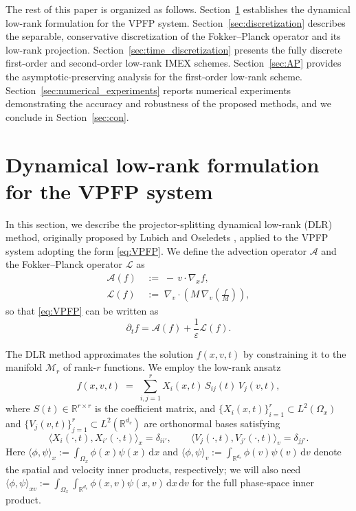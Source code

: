 \documentclass[]{article}
\numberwithin{equation}{section}
\newcommand{\dv}{\mathrm{d}v}
\newcommand{\dx}{\mathrm{d}x}
\begin{document}
The rest of this paper is organized as follows. 
Section~\ref{sec:dlr_algorithm} establishes the dynamical low-rank formulation for the VPFP system.
Section~\ref{sec:discretization} describes the separable, conservative discretization of the Fokker--Planck operator and its low-rank projection.
Section~\ref{sec:time_discretization} presents the fully discrete first-order and second-order low-rank IMEX schemes.
Section~\ref{sec:AP} provides the asymptotic-preserving analysis for the first-order low-rank scheme.
Section~\ref{sec:numerical_experiments} reports numerical experiments demonstrating the accuracy and robustness of the proposed methods, and we conclude in Section~\ref{sec:con}.

\section{Dynamical low-rank formulation for the VPFP system}
\label{sec:dlr_algorithm}

In this section, we describe the projector-splitting dynamical low-rank (DLR) method, originally proposed by Lubich and Oseledets \cite{lubich2014projector}, applied to the VPFP system  adopting the form \eqref{eq:VPFP}. We define the advection operator $\mathcal{A}$ and the Fokker--Planck operator $\mathcal{L}$ as
\begin{align}
  \mathcal{A}(f) &\,:=\; -\,v\cdot\nabla_x f, \label{eq:op_A_def} \\
  \mathcal{L}(f) &\,:=\; \nabla_v \cdot \left(M\,\nabla_v \left(\tfrac{f}{M}\right)\right),\label{eq:op_L_def}
\end{align}
so that  \eqref{eq:VPFP} can be written as 
\begin{equation}
\label{eq:VPFP-1}
    \partial_t f = \mathcal{A}(f) + \frac{1}{\varepsilon}\mathcal{L}(f).
\end{equation}

The DLR method approximates the solution \(f(x,v,t)\) by constraining it to the manifold \(\mathcal{M}_r\) of rank-\(r\) functions. We employ the low-rank ansatz
\begin{equation}\label{eq:rank_dlra_sum}
  f(x,v,t) \;=\;
\sum_{i,j=1}^r X_i(x,t)\,S_{ij}(t)\,V_j(v,t),
\end{equation}
where \(S(t) \in \mathbb{R}^{r \times r}\) is the coefficient matrix, and \(\{X_i(x,t)\}_{i=1}^r \subset L^2(\Omega_x)\) and \(\{V_j(v,t)\}_{j=1}^r \subset L^2(\mathbb{R}^{d_v})\) are orthonormal bases satisfying
\[
  \langle X_i(\cdot,t),X_{i'}(\cdot,t)\rangle_x=\delta_{ii'},
  \qquad
  \langle V_j(\cdot,t),V_{j'}(\cdot,t)\rangle_v=\delta_{jj'}.
\]
Here $\langle \phi, \psi\rangle_x:=\int_{\Omega_x} \phi(x)\psi(x)\,\dx$ and $\langle \phi, \psi\rangle_v:=\int_{\mathbb{R}^{d_v}} \phi(v)\psi(v)\,\dv$ denote the spatial and velocity inner products, respectively; we will also need $\langle \phi, \psi\rangle_{xv}:=\int_{\Omega_x}\int_{\mathbb{R}^{d_v}}  \phi(x,v)\psi(x,v)\,\dx\,\dv$ for the full phase-space inner product. 
\end{document}
